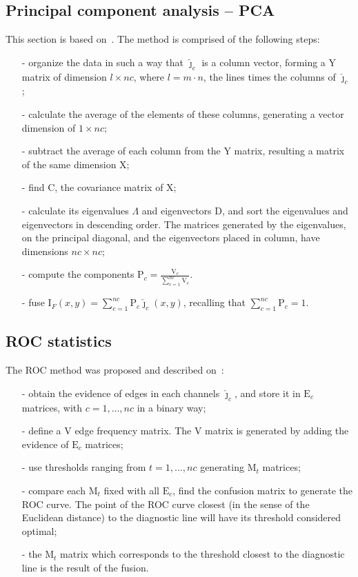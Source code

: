 \documentclass[journal]{IEEEtran}
\begin{document}
\subsection{Principal component analysis -- PCA}

This section is based on~\cite{n_r,mit}.
The method is comprised of the following steps:
\begin{itemize}
\item[-] organize the data in such a way that $\widehat\jmath_c$ is a column vector, forming a Y matrix of dimension $l\times nc$, where $l=m\cdot n$, the lines times the columns of $\widehat\jmath_c$;
\item[-] calculate the average of the elements of these columns, generating a vector dimension of $1\times nc$;
\item[-] subtract the average of each column from the Y matrix, resulting a matrix of the same dimension X; 
\item[-] find C, the covariance matrix of X;
\item[-] calculate its eigenvalues $\Lambda$ and eigenvectors D, and sort the eigenvalues and eigenvectors in descending order. The matrices generated by the eigenvalues, on the principal diagonal, and the eigenvectors placed in column, have dimensions $nc\times nc$;
\item[-] compute the components $\text{P}_c=\frac{\text{V}_c}{\sum_{c=1}^{nc} \text{V}_c}$. %
\item[-] fuse $\text{I}_F(x,y)=\sum_{c=1}^{nc}\text{P}_c\widehat\jmath_c(x,y)$, recalling that $\sum_{c=1}^{nc}\text{P}_c=1$.
\end{itemize}

\subsection{ROC statistics}

The ROC method was proposed and described on~\cite{gs,fawcett}:
\begin{itemize}
\item[-] obtain the evidence of edges in each channels $\widehat\jmath_c$, and store it in $\text{E}_c$ matrices, with $c=1,\dots,nc$ in a binary way;
\item[-] define a V edge frequency matrix. The V matrix is generated by adding the evidence of $\text{E}_c$ matrices;
\item[-] use thresholds ranging from $t=1,\dots,nc$ generating $\text{M}_t$ matrices;
\item[-] compare each $\text{M}_t$ fixed with all $\text{E}_c$, find the confusion matrix to generate the ROC curve. The point of the ROC curve closest (in the sense of the Euclidean distance) to the diagnostic line will have its threshold considered optimal;
\item[-] the $\text{M}_t$ matrix which corresponds to the threshold closest to the diagnostic line is the result of the fusion.
\end{itemize}
\end{document}
